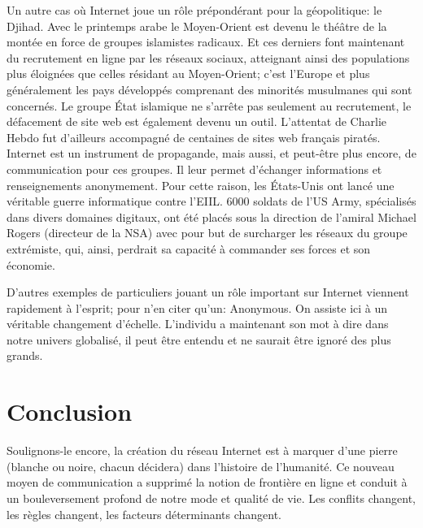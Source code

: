 \documentclass[article, french]{yReport}
\begin{document}
	Un autre cas où Internet joue un rôle prépondérant pour la géopolitique: le Djihad. Avec le printemps arabe le Moyen-Orient est devenu le théâtre de la montée en force de groupes islamistes radicaux. Et ces derniers font maintenant du recrutement en ligne par les réseaux sociaux, atteignant ainsi des populations plus éloignées que celles résidant au Moyen-Orient; c'est l'Europe et plus généralement les pays développés comprenant des minorités musulmanes qui sont concernés. Le groupe État islamique ne s'arrête pas seulement au recrutement, le défacement de site web est également devenu un outil. L'attentat de Charlie Hebdo fut d'ailleurs accompagné de centaines de sites web français piratés. Internet est un instrument de propagande, mais aussi, et peut-être plus encore, de communication pour ces groupes. Il leur permet d'échanger informations et renseignements anonymement. Pour cette raison, les États-Unis ont lancé une véritable guerre informatique contre l'EIIL. 6000 soldats de l'US Army, spécialisés dans divers domaines digitaux, ont été placés sous la direction de l'amiral Michael Rogers (directeur de la NSA) avec pour but de surcharger les réseaux du groupe extrémiste, qui, ainsi, perdrait sa capacité à commander ses forces et son économie.
	
	D'autres exemples de particuliers jouant un rôle important sur Internet viennent rapidement à l'esprit; pour n'en citer qu'un: Anonymous. On assiste ici à un véritable changement d'échelle. L'individu a maintenant son mot à dire dans notre univers globalisé, il peut être entendu et ne saurait être ignoré des plus grands.
	
	\section{Conclusion}
	Soulignons-le encore, la création du réseau Internet est à marquer d'une pierre (blanche ou noire, chacun décidera) dans l'histoire de l'humanité. Ce nouveau moyen de communication a supprimé la notion de frontière en ligne et conduit à un bouleversement profond de notre mode et qualité de vie. Les conflits changent, les règles changent, les facteurs déterminants changent.
	
\end{document}
